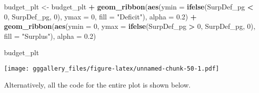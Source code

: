 \documentclass[]{book}
\newenvironment{Shaded}{\begin{snugshade}}{\end{snugshade}}
\newcommand{\DataTypeTok}[1]{\textcolor[rgb]{0.13,0.29,0.53}{#1}}
\newcommand{\DecValTok}[1]{\textcolor[rgb]{0.00,0.00,0.81}{#1}}
\newcommand{\FloatTok}[1]{\textcolor[rgb]{0.00,0.00,0.81}{#1}}
\newcommand{\KeywordTok}[1]{\textcolor[rgb]{0.13,0.29,0.53}{\textbf{#1}}}
\newcommand{\NormalTok}[1]{#1}
\newcommand{\OperatorTok}[1]{\textcolor[rgb]{0.81,0.36,0.00}{\textbf{#1}}}
\newcommand{\StringTok}[1]{\textcolor[rgb]{0.31,0.60,0.02}{#1}}
\begin{document}
\begin{Shaded}
\begin{Highlighting}[]
\NormalTok{budget_plt <-}\StringTok{ }\NormalTok{budget_plt }\OperatorTok{+}\StringTok{ }
\StringTok{  }\KeywordTok{geom_ribbon}\NormalTok{(}\KeywordTok{aes}\NormalTok{(}\DataTypeTok{ymin =} \KeywordTok{ifelse}\NormalTok{(SurpDef_pg }\OperatorTok{<}\StringTok{ }\DecValTok{0}\NormalTok{, SurpDef_pg, }\DecValTok{0}\NormalTok{), }
                  \DataTypeTok{ymax =} \DecValTok{0}\NormalTok{, }
                  \DataTypeTok{fill =} \StringTok{"Deficit"}\NormalTok{), }\DataTypeTok{alpha =} \FloatTok{0.2}\NormalTok{) }\OperatorTok{+}
\StringTok{  }\KeywordTok{geom_ribbon}\NormalTok{(}\KeywordTok{aes}\NormalTok{(}\DataTypeTok{ymin =} \DecValTok{0}\NormalTok{,}
                  \DataTypeTok{ymax =} \KeywordTok{ifelse}\NormalTok{(SurpDef_pg }\OperatorTok{>}\StringTok{ }\DecValTok{0}\NormalTok{, SurpDef_pg, }\DecValTok{0}\NormalTok{), }
                  \DataTypeTok{fill =} \StringTok{"Surplus"}\NormalTok{), }\DataTypeTok{alpha =} \FloatTok{0.2}\NormalTok{) }
  

\NormalTok{budget_plt}
\end{Highlighting}
\end{Shaded}

\texttt{[image: gggallery\_files/figure-latex/unnamed-chunk-50-1.pdf]}

Alternatively, all the code for the entire plot is shown below.
\end{document}
